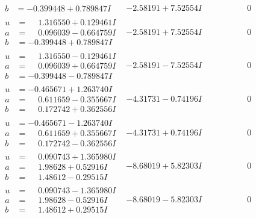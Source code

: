 \documentclass[1p]{elsarticle_modified}
\theoremstyle{definition}
\begin{document}
$$\begin{array}{c|c|c}
\begin{aligned}
b &= -0.399448 + 0.789847 I\end{aligned}
 & -2.58191 + 7.52554 I & \phantom{-0.000000 } 0 \\ \hline\begin{aligned}
u &= \phantom{-}1.316550 + 0.129461 I \\
a &= \phantom{-}0.096039 - 0.664759 I \\
b &= -0.399448 + 0.789847 I\end{aligned}
 & -2.58191 + 7.52554 I & \phantom{-0.000000 } 0 \\ \hline\begin{aligned}
u &= \phantom{-}1.316550 - 0.129461 I \\
a &= \phantom{-}0.096039 + 0.664759 I \\
b &= -0.399448 - 0.789847 I\end{aligned}
 & -2.58191 - 7.52554 I & \phantom{-0.000000 } 0 \\ \hline\begin{aligned}
u &= -0.465671 + 1.263740 I \\
a &= \phantom{-}0.611659 - 0.355667 I \\
b &= \phantom{-}0.172742 + 0.362556 I\end{aligned}
 & -4.31731 - 0.74196 I & \phantom{-0.000000 } 0 \\ \hline\begin{aligned}
u &= -0.465671 - 1.263740 I \\
a &= \phantom{-}0.611659 + 0.355667 I \\
b &= \phantom{-}0.172742 - 0.362556 I\end{aligned}
 & -4.31731 + 0.74196 I & \phantom{-0.000000 } 0 \\ \hline\begin{aligned}
u &= \phantom{-}0.090743 + 1.365980 I \\
a &= \phantom{-}1.98628 + 0.52916 I \\
b &= \phantom{-}1.48612 - 0.29515 I\end{aligned}
 & -8.68019 + 5.82303 I & \phantom{-0.000000 } 0 \\ \hline\begin{aligned}
u &= \phantom{-}0.090743 - 1.365980 I \\
a &= \phantom{-}1.98628 - 0.52916 I \\
b &= \phantom{-}1.48612 + 0.29515 I\end{aligned}
 & -8.68019 - 5.82303 I & \phantom{-0.000000 } 0 \\ \hline\begin{aligned}

\end{aligned}
\end{array}$$
\end{document}
